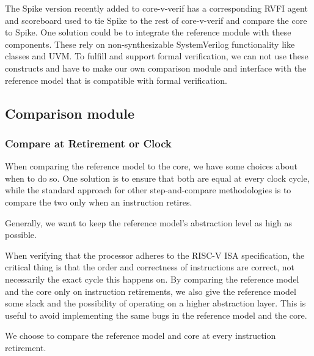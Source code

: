 The Spike version recently added to core-v-verif has a corresponding RVFI agent and scoreboard used to tie Spike to the rest of core-v-verif and compare the core to Spike. One solution could be to integrate the reference module with these components. These rely on non-synthesizable SystemVerilog functionality \cite{mehtaIntroductionSystemVerilog2021} like classes and UVM. To fulfill  and support formal verification, we can not use these constructs and have to make our own comparison module and interface with the reference model that is compatible with formal verification.


\subsection{Comparison module}
\label{sec:des_comparison}

\subsubsection{Compare at Retirement or Clock}
\label{sec:des_retireOrClock}

When comparing the reference model to the core, we have some choices about when to do so. One solution is to ensure that both are equal at every clock cycle, while the standard approach for other step-and-compare methodologies is to compare the two only when an instruction retires.

Generally, we want to keep the reference model's abstraction level as high as possible. 

When verifying that the processor adheres to the RISC-V ISA specification, the critical thing is that the order and correctness of instructions are correct, not necessarily the exact cycle this happens on. By comparing the reference model and the core only on instruction retirements, we also give the reference model some slack and the possibility of operating on a higher abstraction layer. This is useful to avoid implementing the same bugs in the reference model and the core.

We choose to compare the reference model and core at every instruction retirement.

